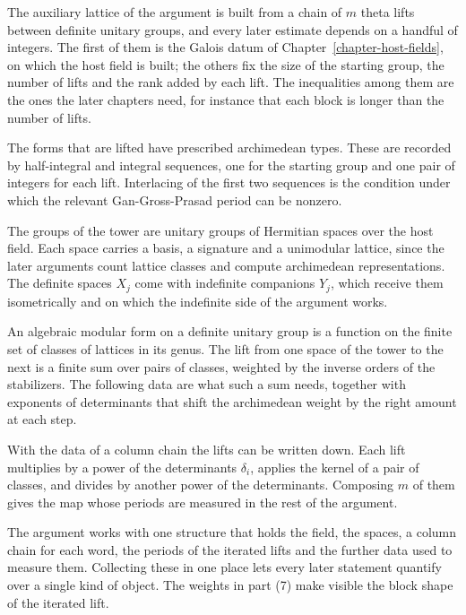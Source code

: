 The auxiliary lattice of the argument is built from a chain of $m$ theta lifts
between definite unitary groups, and every later estimate depends on a handful
of integers. The first of them is the Galois datum of
Chapter~\ref{chapter-host-fields}, on which the host field is built; the others
fix the size of the starting group, the number of lifts and the rank added by
each lift. The inequalities among them are the ones the later chapters need,
for instance that each block is longer than the number of lifts.

The forms that are lifted have prescribed archimedean types. These are recorded
by half-integral and integral sequences, one for the starting group and one
pair of integers for each lift. Interlacing of the first two sequences is the
condition under which the relevant Gan-Gross-Prasad period can be nonzero.

The groups of the tower are unitary groups of Hermitian spaces over the host
field. Each space carries a basis, a signature and a unimodular lattice, since
the later arguments count lattice classes and compute archimedean
representations. The definite spaces $X_j$ come with indefinite companions
$Y_j$, which receive them isometrically and on which the indefinite side of
the argument works.

An algebraic modular form on a definite unitary group is a function on the
finite set of classes of lattices in its genus. The lift from one space of the
tower to the next is a finite sum over pairs of classes, weighted by the
inverse orders of the stabilizers. The following data are what such a sum
needs, together with exponents of determinants that shift the archimedean
weight by the right amount at each step.

With the data of a column chain the lifts can be written down. Each lift
multiplies by a power of the determinants $\delta_i$, applies the kernel of a
pair of classes, and divides by another power of the determinants. Composing
$m$ of them gives the map whose periods are measured in the rest of the
argument.

The argument works with one structure that holds the field, the spaces, a
column chain for each word, the periods of the iterated lifts and the further
data used to measure them. Collecting these in one place lets every later
statement quantify over a single kind of object. The weights in part (7) make
visible the block shape of the iterated lift.

